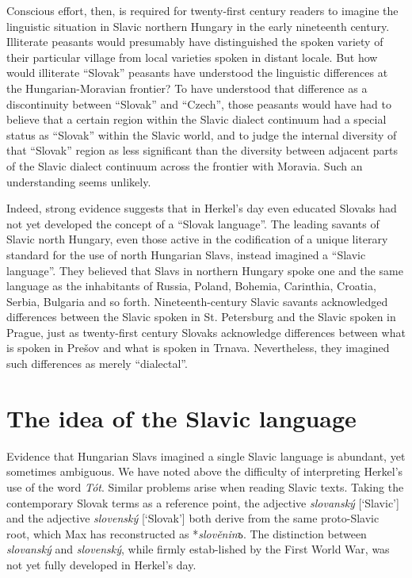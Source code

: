 Conscious effort, then, is required for twenty-first century readers to imagine the linguistic situation in Slavic northern Hungary in the early nineteenth century. Illiterate peasants would presumably have distinguished the spoken variety of their particular village from local varieties spoken in distant locale. But how would illiterate “Slovak” peasants have understood the linguistic differences at the Hungarian-Moravian frontier? To have understood that difference as a discontinuity between “Slovak” and “Czech”, those peasants would have had to believe that a certain region within the Slavic dialect continuum had a special status as “Slovak” within the Slavic world, and to judge the internal diversity of that “Slovak” region as less significant than the diversity between adjacent parts of the Slavic dialect continuum across the frontier with Moravia. Such an understanding seems unlikely.

Indeed, strong evidence suggests that in Herkel’s day even educated Slovaks had not yet developed the concept of a “Slovak language”. The leading savants of Slavic north Hungary, even those active in the codification of a unique literary standard for the use of north Hungarian Slavs, instead imagined a “Slavic language”. They believed that Slavs in northern Hungary spoke one and the same language as the inhabitants of Russia, Poland, Bohemia, Carinthia, Croatia, Serbia, Bulgaria and so forth. Nineteenth-century Slavic savants acknowledged differences between the Slavic spoken in St. Petersburg and the Slavic spoken in Prague, just as twenty-first century Slovaks acknowledge differences between what is spoken in Prešov and what is spoken in Trnava. Nevertheless, they imagined such differences as merely “dialectal”.

\section{The idea of the Slavic language}

Evidence that Hungarian Slavs imagined a single Slavic language is abundant, yet sometimes ambiguous. We have noted above the difficulty of interpreting Herkel’s use of the word \textit{Tót}. Similar problems arise when reading Slavic texts. Taking the contemporary Slovak terms as a reference point, the adjective \textit{slovanský} [‘Slavic’] and the adjective \textit{slovenský} [‘Slovak’] both derive from the same proto-Slavic root, which Max \citet[664--665]{vasmer_russisches_1958} has reconstructed as *\textit{slo\-věninъ}. The distinction between \textit{slovanský} and \textit{slovenský}, while firmly estab-\linebreak{}lished by the First World War, was not yet fully developed in Herkel’s day.

